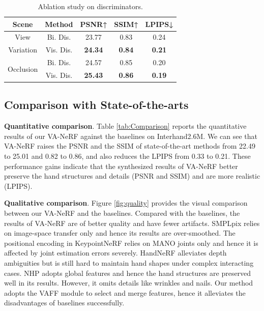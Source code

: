 \documentclass[letterpaper]{article} %
\begin{document}
\begin{table}[t]
\centering
\caption{Ablation study on discriminators.}
\label{tab:disc}
\begin{tabular}{ccccc}
\toprule
Scene  & Method & PSNR↑    & SSIM↑    & LPIPS↓     \\
\midrule
View & Bi. Dis. &  23.77  &  0.83  &  0.24  \\ \cline{2-5}
Variation & Vis. Dis.  &  \textbf{24.34}  &  \textbf{0.84}   &  \textbf{0.21}     \\ \hline
\multirow[c]{2}{*}{Occlusion} & Bi. Dis. &  24.57  &  0.85  &  0.20  \\ \cline{2-5}
 & Vis. Dis.  &  \textbf{25.43}   &  \textbf{0.86}  &  \textbf{0.19}    \\
\bottomrule
\end{tabular}
\end{table}



\subsection{Comparison with State-of-the-arts}

\textbf{Quantitative comparison}. Table \ref{tab:Comparison} reports the quantitative results of our VA-NeRF against the baselines on Interhand2.6M. We can see that VA-NeRF raises the PSNR and the SSIM of state-of-the-art methods from 22.49 to 25.01 and 0.82 to 0.86, and also reduces the LPIPS from 0.33 to 0.21. These performance gains indicate that the synthesized results of VA-NeRF better preserve the hand structures and details (PSNR and SSIM) and are more realistic (LPIPS).

\noindent\textbf{Qualitative comparison}. Figure \ref{fig:quality} provides the visual comparison between our VA-NeRF and the baselines. Compared with the baselines, the results of VA-NeRF are of better quality and have fewer artifacts. SMPLpix relies on image-space transfer only and hence its results are over-smoothed. The positional encoding in KeypointNeRF relies on MANO joints only and hence it is affected by joint estimation errors severely. HandNeRF alleviates depth ambiguities but is still hard to maintain hand shapes under complex interacting cases. NHP adopts global features and hence the hand structures are preserved well in its results. However, it omits details like wrinkles and nails. Our method adopts the VAFF module to select and merge features, hence it alleviates the disadvantages of baselines successfully. 
\end{document}

